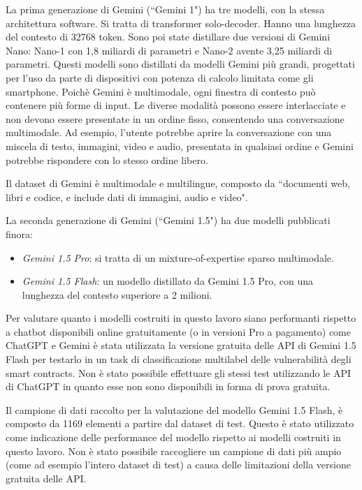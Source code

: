 \documentclass[../../Thesis.tex]{subfiles}
\begin{document}
La prima generazione di Gemini (``Gemini 1") ha tre modelli, con la stessa architettura software. Si tratta di transformer solo-decoder. Hanno una lunghezza del contesto di 32768 token. Sono poi state distillare due versioni di Gemini Nano: Nano-1 con 1,8 miliardi di parametri e Nano-2 avente 3,25 miliardi di parametri. Questi modelli sono distillati da modelli Gemini pi\`u grandi, progettati per l'uso da parte di dispositivi con potenza di calcolo limitata come gli smartphone. Poich\`e Gemini \`e multimodale, ogni finestra di contesto pu\`o contenere pi\`u forme di input. Le diverse modalit\`a possono essere interlacciate e non devono essere presentate in un ordine fisso, consentendo una conversazione multimodale. Ad esempio, l'utente potrebbe aprire la conversazione con una miscela di testo, immagini, video e audio, presentata in qualsiasi ordine e Gemini potrebbe rispondere con lo stesso ordine libero.

Il dataset di Gemini \`e multimodale e multilingue, composto da ``documenti web, libri e codice, e include dati di immagini, audio e video".

La seconda generazione di Gemini (``Gemini 1.5") ha due modelli pubblicati finora:
\begin{itemize}
    \item \emph{Gemini 1.5 Pro}: si tratta di un mixture-of-expertise sparso multimodale.
    \item \emph{Gemini 1.5 Flash}: un modello distillato da Gemini 1.5 Pro, con una lunghezza del contesto superiore a 2 milioni.
\end{itemize}


Per valutare quanto i modelli costruiti in questo lavoro siano performanti rispetto a chatbot disponibili online gratuitamente (o in versioni Pro a pagamento) come ChatGPT e Gemini \`e stata utilizzata la versione gratuita delle API di Gemini 1.5 Flash per testarlo in un task di classificazione multilabel delle vulnerabilit\`a degli smart contracts. Non \`e stato possibile effettuare gli stessi test utilizzando le API di ChatGPT in quanto esse non sono disponibili in forma di prova gratuita.

Il campione di dati raccolto per la valutazione del modello Gemini 1.5 Flash, \`e composto da 1169 elementi a  partire dal dataset di test. Questo \`e stato utilizzato come indicazione delle performance del modello rispetto ai modelli costruiti in questo lavoro. Non \`e stato possibile raccogliere un campione di dati pi\`u ampio (come ad esempio l'intero dataset di test) a causa delle limitazioni della versione gratuita delle API. 
\end{document}
